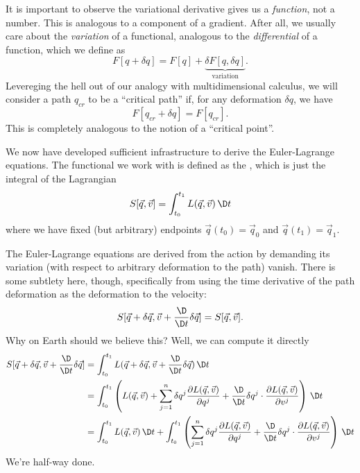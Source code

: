 \begin{remark}
It is important to observe the variational derivative gives us a
\emph{function}, not a number. This is analogous to a component of a
gradient. After all, we usually care about the \emph{variation} of a
functional, analogous to the \emph{differential} of a function, which
we define as
\begin{equation}
F[q + \delta q] = F[q] + \underbrace{\delta F[q, \delta q]}_{\text{variation}}.
\end{equation}
Levereging the hell out of our analogy with multidimensional calculus,
we will consider a path $q_{cr}$ to be a ``critical path'' if, for any
deformation $\delta q$, we have
\begin{equation}
F[q_{cr} + \delta q] = F[q_{cr}].
\end{equation}
This is completely analogous to the notion of a ``critical point''.
\end{remark}

We now have developed sufficient infrastructure to derive the
Euler-Lagrange equations. The functional we work with is defined as the
, which is just the integral of the Lagrangian
\begin{equation}
S[\vec{q},\vec{v}] = \int^{t_{1}}_{t_{0}}L(\vec{q},\vec{v})\,\D t
\end{equation}
where we have fixed (but arbitrary) endpoints
$\vec{q}(t_{0})=\vec{q}_{0}$ and $\vec{q}(t_{1})=\vec{q}_{1}$.

The Euler-Lagrange equations are derived from the action by demanding
its variation (with respect to arbitrary deformation to the path)
vanish. There is some subtlety here, though, specifically from using the
time derivative of the path deformation as the deformation to the
velocity:
\begin{equation}
S[\vec{q} + \delta\vec{q}, \vec{v} + \frac{\D}{\D t}\delta\vec{q}]
= S[\vec{q},\vec{v}].
\end{equation}
Why on Earth should we believe this? Well, we can compute it directly
\begin{subequations}
\begin{align}
S[\vec{q} + \delta\vec{q}, \vec{v} + \frac{\D}{\D t}\delta\vec{q}]
&=\int^{t_{1}}_{t_{0}} L(\vec{q} + \delta\vec{q}, \vec{v} + \frac{\D}{\D t}\delta\vec{q})\,\D t\\
&=\int^{t_{1}}_{t_{0}}\left(
L(\vec{q},\vec{v}) + \sum^{n}_{j=1}\delta q^{j}\frac{\partial L(\vec{q},\vec{v})}{\partial q^{j}}
+\frac{\D}{\D t}\delta q^{j}\cdot \frac{\partial L(\vec{q},\vec{v})}{\partial v^{j}}
\right)\,\D t\\
&=\int^{t_{1}}_{t_{0}}L(\vec{q},\vec{v})\,\D t +
\int^{t_{1}}_{t_{0}}\left(\sum^{n}_{j=1}\delta q^{j}\frac{\partial L(\vec{q},\vec{v})}{\partial q^{j}}
+\frac{\D}{\D t}\delta q^{j}\cdot \frac{\partial L(\vec{q},\vec{v})}{\partial v^{j}}
\right)\,\D t
\end{align}
\end{subequations}
We're half-way done.

